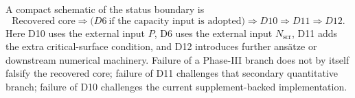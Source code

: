 A compact schematic of the status boundary is
\[
\text{Recovered core}
\Longrightarrow
\bigl(D6\ \text{if the capacity input is adopted}\bigr)
\Longrightarrow
D10
\Longrightarrow
D11
\Longrightarrow
D12.
\]
Here D10 uses the external input \(P\), D6 uses the external input \(N_{\mathrm{scr}}\), D11 adds the extra critical-surface condition, and D12 introduces further ans\"atze or downstream numerical machinery. Failure of a Phase-III branch does not by itself falsify the recovered core; failure of D11 challenges that secondary quantitative branch; failure of D10 challenges the current supplement-backed implementation.
